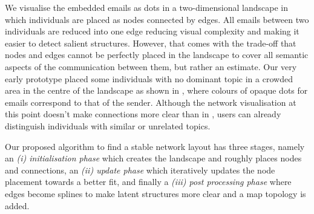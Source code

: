 We visualise the embedded emails as dots in a two-dimensional landscape in which individuals are placed as nodes connected by edges.
All emails between two individuals are reduced into one edge reducing visual complexity and making it easier to detect salient structures.
However, that comes with the trade-off that nodes and edges cannot be perfectly placed in the landscape to cover all semantic aspects of the communication between them, but rather an estimate.
Our very early prototype placed some individuals with no dominant topic in a crowded area in the centre of the landscape as shown in , where colours of opaque dots for emails correspond to that of the sender.
Although the network visualisation at this point doesn't make connections more clear than in , users can already distinguish individuals with similar or unrelated topics.

Our proposed algorithm to find a stable network layout has three stages, namely an \textit{(i) initialisation phase} which creates the landscape and roughly places nodes and connections, an \textit{(ii) update phase} which iteratively updates the node placement towards a better fit, and finally a \textit{(iii) post processing phase} where edges become splines to make latent structures more clear and a map topology is added.






